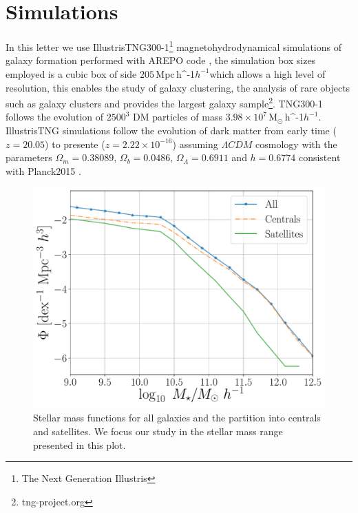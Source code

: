 \documentclass[a4paper,fleqn,usenatbib]{mnras}
\newcommand{\Msunh}{\,{\rm M}$_{\odot}$\,\ifmmode h^{-1}\else $h^{-1}$\fi}
\newcommand{\Mpch}{\,{\rm Mpc}\,\ifmmode h^{-1}\else $h^{-1}$\fi}
\begin{document}
\newpage

\section{Simulations}
\label{sec:simul} %

In this letter we use IllustrisTNG300-1\footnote{The Next Generation Illustris} magnetohydrodynamical simulations of galaxy formation performed with AREPO code \citep{2018MNRAS.473.4077P}, the simulation box sizes employed is a cubic box of side $205$\Mpch which allows a high level of resolution, this enables the study of galaxy clustering, the analysis of rare objects such as galaxy clusters and provides the largest galaxy sample\footnote{tng-project.org}.
TNG300-1 follows the evolution of $2500^3$ DM particles of mass $3.98 \times 10^7$\Msunh. IllustrisTNG simulations follow the evolution of dark matter from early time  ($z=20.05$) to presente ($z=2.22\times 10^{-16}$) assuming $\Lambda CDM$ cosmology with the parameters $\Omega_m=0.38089$, $\Omega_b=0.0486$, $\Omega_\Lambda= 0.6911$ and $h=0.6774$ consistent with Planck2015 \citep{2016A&A...594A..13P}.\\

\begin{figure}
    \centering
    \includegraphics[width=1\columnwidth]{figuras/Histogramas.pdf}
    \caption{Stellar mass functions for all galaxies and the partition into centrals and satellites. We focus our study in the stellar mass range presented in this plot.}
    \label{fig:stellar_fuction}
\end{figure}
\end{document}
